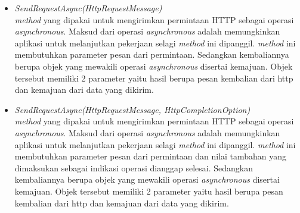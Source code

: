 \begin{itemize}
	\item \textit{SendRequestAsync(HttpRequestMessage)} \\
	\textit{method} yang dipakai untuk mengirimkan permintaan HTTP sebagai operasi \textit{asynchronous}. Maksud dari operasi \textit{asynchronous} adalah memungkinkan aplikasi untuk melanjutkan pekerjaan selagi \textit{method} ini dipanggil\footnotemark[2]. \textit{method} ini membutuhkan parameter pesan dari permintaan. Sedangkan kembaliannya berupa objek yang mewakili operasi \textit{asynchronous} disertai kemajuan. Objek tersebut memiliki 2 parameter yaitu hasil berupa pesan kembalian dari http dan kemajuan dari data yang dikirim.
	\item \textit{SendRequestAsync(HttpRequestMessage, HttpCompletionOption)} \\
	\textit{method} yang dipakai untuk mengirimkan permintaan HTTP sebagai operasi \textit{asynchronous}. Maksud dari operasi \textit{asynchronous} adalah memungkinkan aplikasi untuk melanjutkan pekerjaan selagi \textit{method} ini dipanggil\footnotemark[2]. \textit{method} ini membutuhkan parameter pesan dari permintaan dan nilai tambahan yang dimaksukan sebagai indikasi operasi dianggap selesai. Sedangkan kembaliannya berupa objek yang mewakili operasi \textit{asynchronous} disertai kemajuan. Objek tersebut memiliki 2 parameter yaitu hasil berupa pesan kembalian dari http dan kemajuan dari data yang dikirim.
\end{itemize}


